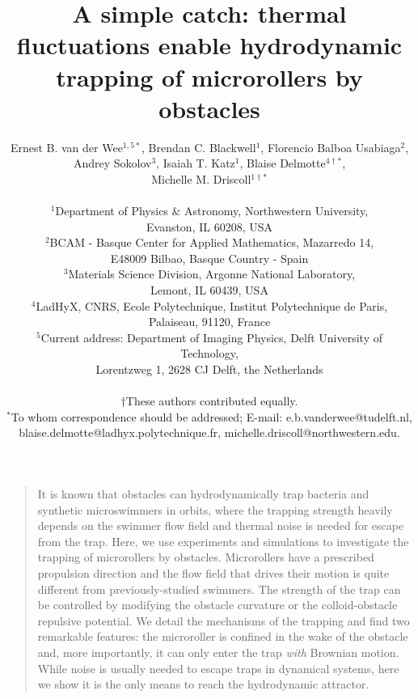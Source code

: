 \documentclass[12pt]{article}
\title{A simple catch: thermal fluctuations enable hydrodynamic trapping of microrollers by obstacles}
\author
{Ernest B. van der Wee$^{1,5\ast}$, Brendan C. Blackwell$^{1}$, Florencio Balboa Usabiaga$^{2}$,\\
Andrey Sokolov$^{3}$, Isaiah T. Katz$^{1}$, Blaise Delmotte$^{4\dagger\ast}$,\\
Michelle M. Driscoll$^{1\dagger\ast}$\\
\\
\normalsize{$^{1}$Department of Physics \& Astronomy, Northwestern University,}\\
\normalsize{Evanston, IL 60208, USA}\\
\normalsize{$^{2}$BCAM - Basque Center for Applied Mathematics, Mazarredo 14,}\\
\normalsize{E48009 Bilbao, Basque Country - Spain}\\
\normalsize{$^{3}$Materials Science Division, Argonne National Laboratory,}\\
\normalsize{Lemont, IL 60439, USA}\\
\normalsize{$^{4}$LadHyX, CNRS, Ecole Polytechnique, Institut Polytechnique de Paris,}\\
\normalsize{Palaiseau, 91120, France}\\
\normalsize{$^{5}$Current address: Department of Imaging Physics, Delft University of Technology, }\\
\normalsize{Lorentzweg 1, 2628 CJ Delft, the Netherlands}\\
\\
\normalsize{$\dagger$These authors contributed equally.}\\
\normalsize{$^\ast$To whom correspondence should be addressed; E-mail:  e.b.vanderwee@tudelft.nl,}\\
\normalsize{blaise.delmotte@ladhyx.polytechnique.fr, michelle.driscoll@northwestern.edu.}
}
\date{}
\newenvironment{sciabstract}{%
\begin{quote} \bf}
{\end{quote}}
\begin{document}
 
\baselineskip24pt
\maketitle 


\begin{sciabstract} %

It is known that obstacles can hydrodynamically trap bacteria and synthetic microswimmers in orbits, where the trapping strength heavily depends on the swimmer flow field and thermal noise is needed for escape from the trap. Here, we use experiments and simulations to investigate the trapping of microrollers by obstacles. Microrollers have a prescribed propulsion direction and the flow field that drives their motion is quite different from previously-studied swimmers. The strength of the trap can be controlled by modifying the obstacle curvature or the colloid-obstacle repulsive potential. We detail the mechanisms of the trapping and find two remarkable features: the microroller is confined in the wake of the obstacle and, more importantly, it can only enter the trap \textit{with} Brownian motion. While noise is usually needed to escape traps in dynamical systems, here we show it is the only means to reach the hydrodynamic attractor.

\end{sciabstract}
\end{document}
